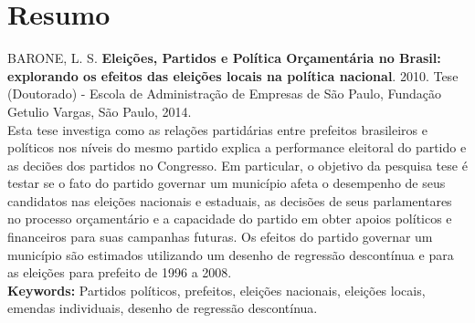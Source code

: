 \chapter*{Resumo}

\noindent BARONE, L. S. \textbf{Eleições, Partidos e Política Orçamentária no Brasil: explorando os efeitos das eleições locais na política nacional}. 
2010. %
Tese (Doutorado) - Escola de Administração de Empresas de São Paulo,
Fundação Getulio Vargas, São Paulo, 2014.
\\

Esta tese investiga como as relações partidárias entre prefeitos brasileiros e políticos nos níveis do mesmo partido explica a performance eleitoral do partido e as deciões dos partidos no Congresso. Em particular, o objetivo da pesquisa tese é testar se o fato do partido governar um município afeta o desempenho de seus candidatos nas eleições nacionais e estaduais, as decisões de seus parlamentares no processo orçamentário e a capacidade do partido em obter apoios políticos e financeiros para suas campanhas futuras. Os efeitos do partido governar um município são estimados utilizando um desenho de regressão descontínua e para as eleições para prefeito de 1996 a 2008.
\newline
\\

\noindent \textbf{Keywords:} Partidos políticos, prefeitos, eleições nacionais, eleições locais, emendas individuais, desenho de regressão descontínua.

